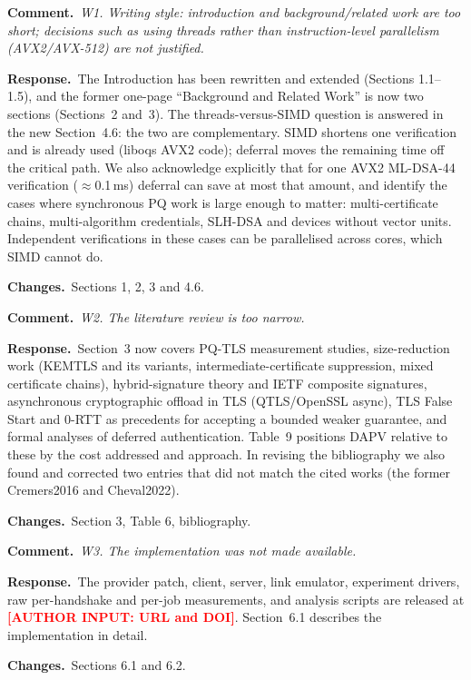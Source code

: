 \documentclass[11pt]{article}
\newcommand{\RC}[1]{\par\medskip\noindent\textcolor{rc}{\textbf{Comment.}}~\textit{#1}\par}
\newcommand{\AR}{\par\noindent\textbf{Response.}~}
\newcommand{\CH}{\par\noindent\textbf{Changes.}~}
\newcommand{\authorinput}[1]{\textcolor{red}{\textbf{[AUTHOR INPUT: #1]}}}
\begin{document}
\RC{W1. Writing style: introduction and background/related work are too
short; decisions such as using threads rather than instruction-level
parallelism (AVX2/AVX-512) are not justified.}
\AR The Introduction has been rewritten and extended (Sections 1.1--1.5),
and the former one-page ``Background and Related Work'' is now two
sections (Sections~2 and~3).  The threads-versus-SIMD question is answered
in the new Section~4.6: the two are complementary.  SIMD shortens one
verification and is already used (liboqs AVX2 code); deferral moves the
remaining time off the critical path.  We also acknowledge explicitly that
for one AVX2 ML-DSA-44 verification ($\approx$0.1\,ms) deferral can save
at most that amount, and identify the cases where synchronous PQ work is
large enough to matter: multi-certificate chains, multi-algorithm
credentials, SLH-DSA and devices without vector units.  Independent
verifications in these cases can be parallelised across cores, which SIMD
cannot do.
\CH Sections 1, 2, 3 and 4.6.

\RC{W2. The literature review is too narrow.}
\AR Section~3 now covers PQ-TLS measurement studies, size-reduction work
(KEMTLS and its variants, intermediate-certificate suppression, mixed
certificate chains), hybrid-signature theory and IETF composite
signatures, asynchronous cryptographic offload in TLS (QTLS/OpenSSL async),
TLS False Start and 0-RTT as precedents for accepting a bounded weaker
guarantee, and formal analyses of deferred authentication.  Table~9
positions DAPV relative to these by the cost addressed and approach.
In revising the bibliography we also found and corrected two entries that
did not match the cited works (the former Cremers2016 and Cheval2022).
\CH Section 3, Table 6, bibliography.

\RC{W3. The implementation was not made available.}
\AR The provider patch, client, server, link emulator, experiment drivers,
raw per-handshake and per-job measurements, and analysis scripts are
released at \authorinput{URL and DOI}.  Section~6.1 describes the
implementation in detail.
\CH Sections 6.1 and 6.2.
\end{document}
